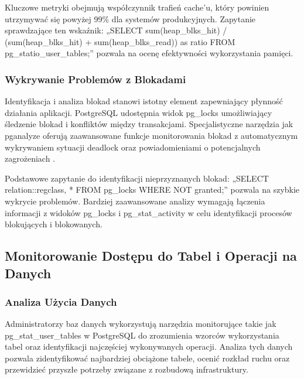\documentclass[letterpaper,10pt,polish]{sphinxmanual}
\begin{document}
\sphinxAtStartPar
Kluczowe metryki obejmują współczynnik trafień cache’u, który powinien utrzymywać się powyżej 99\% dla systemów produkcyjnych. Zapytanie sprawdzające ten wskaźnik: „SELECT sum(heap\_blks\_hit) / (sum(heap\_blks\_hit) + sum(heap\_blks\_read)) as ratio FROM pg\_statio\_user\_tables;” pozwala na ocenę efektywności wykorzystania pamięci.


\subsubsection{Wykrywanie      Problemów       z       Blokadami}
\label{\detokenize{rozdzial2/repo-wspolne/index:wykrywanie-problemow-z-blokadami}}
\sphinxAtStartPar
Identyfikacja i analiza blokad stanowi istotny element zapewniający płynność działania aplikacji. PostgreSQL udostępnia widok pg\_locks umożliwiający śledzenie blokad i konfliktów między transakcjami. Specjalistyczne narzędzia jak pganalyze oferują zaawansowane funkcje monitorowania blokad z automatycznym wykrywaniem sytuacji deadlock oraz powiadomieniami o potencjalnych zagrożeniach .

\sphinxAtStartPar
Podstawowe zapytanie do identyfikacji nieprzyznanych blokad: „SELECT relation::regclass, * FROM pg\_locks WHERE NOT granted;” pozwala na szybkie wykrycie problemów. Bardziej zaawansowane analizy wymagają łączenia informacji z widoków pg\_locks i pg\_stat\_activity w celu identyfikacji procesów blokujących i blokowanych.


\subsection{Monitorowanie   Dostępu do      Tabel   i       Operacji        na      Danych}
\label{\detokenize{rozdzial2/repo-wspolne/index:monitorowanie-dostepu-do-tabel-i-operacji-na-danych}}

\subsubsection{Analiza Użycia  Danych}
\label{\detokenize{rozdzial2/repo-wspolne/index:analiza-uzycia-danych}}
\sphinxAtStartPar
Administratorzy baz danych wykorzystują narzędzia monitorujące takie jak pg\_stat\_user\_tables w PostgreSQL do zrozumienia wzorców wykorzystania tabel oraz identyfikacji najczęściej wykonywanych operacji. Analiza tych danych pozwala zidentyfikować najbardziej obciążone tabele, ocenić rozkład ruchu oraz przewidzieć przyszłe potrzeby związane z rozbudową infrastruktury.
\end{document}
